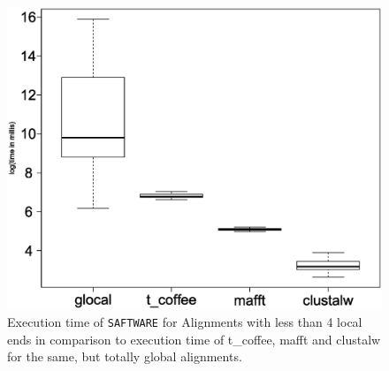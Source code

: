 \documentclass[a4paper,10pt]{article}
\newcommand{\TODO}[1]{\begingroup\color{red}#1\endgroup}
\newcommand{\FK}[1]{\begingroup\color{blue}#1\endgroup}
\newcommand{\SAFTWARE}{\TODO{\texttt{SAFTWARE}}}
\begin{document}
\FK{  
\begin{figure}
  \begin{center}
    \includegraphics[width=1\columnwidth]{times_smaller4_boxplot.eps}
  \end{center}
 \label{fig:littleLoc}
  \caption{Execution time of \SAFTWARE{} for Alignments with less than 4 local ends in comparison to execution time of t\_coffee, mafft and clustalw for the same, but totally global alignments.}
\end{figure}

}
\end{document}
